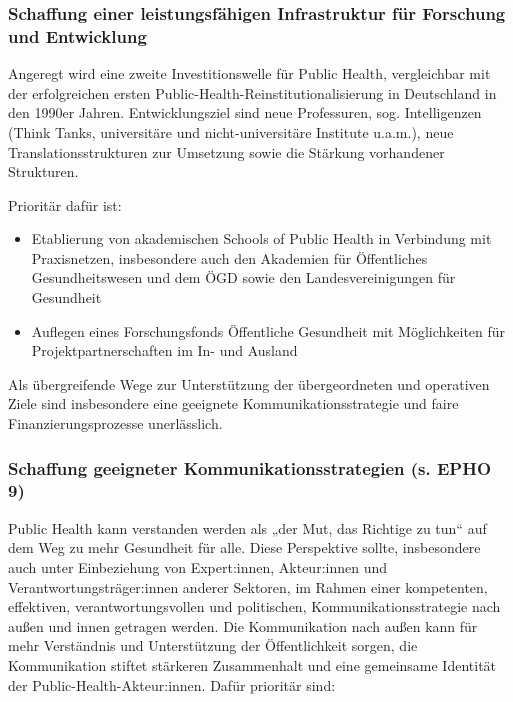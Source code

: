 \documentclass{article}
\begin{document}
\subsubsection{Schaffung einer leistungsfähigen Infrastruktur für Forschung und Entwicklung}\label{H684582}



Angeregt wird eine zweite Investitionswelle für Public Health, vergleichbar mit der erfolgreichen ersten Public-Health-Reinstitutionalisierung in Deutschland in den 1990er Jahren. Entwicklungsziel sind neue Professuren, sog. Intelligenzen (Think Tanks, universitäre und nicht-universitäre Institute u.a.m.), neue Translationsstrukturen zur Umsetzung sowie die Stärkung vorhandener Strukturen. 


Prioritär dafür ist: 

\begin{itemize}
\item Etablierung von akademischen Schools of Public Health in Verbindung mit Praxisnetzen, insbesondere auch den Akademien für Öffentliches Gesundheitswesen und dem ÖGD sowie den Landesvereinigungen für Gesundheit


\item Auflegen eines Forschungsfonds Öffentliche Gesundheit mit Möglichkeiten für Projektpartnerschaften im In- und Ausland 


\end{itemize}

Als übergreifende Wege zur Unterstützung der übergeordneten und operativen Ziele sind insbesondere eine geeignete Kommunikationsstrategie und faire Finanzierungsprozesse unerlässlich. 


\subsubsection{Schaffung geeigneter Kommunikationsstrategien (s. EPHO 9)}\label{H9186931}



Public Health kann verstanden werden als „der Mut, das Richtige zu tun“ auf dem Weg zu mehr Gesundheit für alle. Diese Perspektive sollte, insbesondere auch unter Einbeziehung von Expert:innen, Akteur:innen und Verantwortungsträger:innen anderer Sektoren, im Rahmen einer kompetenten, effektiven, verantwortungsvollen und politischen, Kommunikationsstrategie nach außen und innen getragen werden. Die Kommunikation nach außen kann für mehr Verständnis und Unterstützung der Öffentlichkeit sorgen, die Kommunikation stiftet stärkeren Zusammenhalt und eine gemeinsame Identität der Public-Health-Akteur:innen. Dafür prioritär sind:
\end{document}
